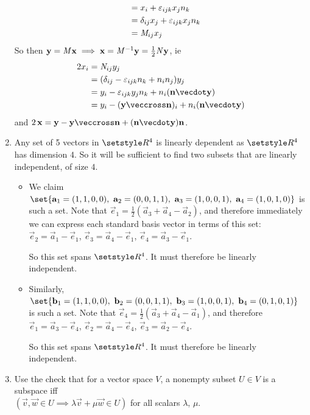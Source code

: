 \documentclass[fleqn,a4paper,11pt]{article}
\begin{document}
\begin{enumerate}[label=\textbf{\arabic*.}]
\begin{alignat*}
    &&           &= x_i + \epsilon_{ijk} x_j n_k \\
    &&           &= \delta_{ij} x_j + \epsilon_{ijk} x_j n_k \\
    &&           &= \mat M_{ij} x_j
   \end{alignat*}
   So then \(\mathrm{\mathbf{y}} = \mathit{M} \mathrm{\mathbf{x}} \implies
    \mathrm{\mathbf{x}} = \mathit{M}^{-1} \mathrm{\mathbf{y}} = \frac 12 \mathit{N} \mathrm{\mathbf{y}}\), ie
   \begin{align*}
    2 x_i &= \mat N_{ij} y_j \\
          &= (\delta_{ij} - \epsilon_{ijk} n_k + n_i n_j) y_j \\
          &= y_i - \epsilon_{ijk} y_j n_k + n_i(\vec n \vecdot \vec y) \\
          &= y_i - (\vec y \veccross \vec n)_i + n_i(\vec n \vecdot \vec y)
   \end{align*}
   and
   \(2\,\vec x
     = \vec y - \vec y \veccross \vec n + (\vec n \vecdot \vec y) \vec n\).
   \item
    Any set of 5 vectors in \(\Reals^4\) is linearly dependent as
    \(\Reals^4\) has dimension \(4\). So it will be sufficient to find two
    subsets that are linearly independent, of size \(4\).
    \begin{itemize}
     \item
      We claim
      \(\set{\vec a_1 = (1, 1, 0, 0),\ \vec a_2 = (0, 0, 1, 1),
           \ \vec a_3 = (1, 0, 0, 1),\ \vec a_4 = (1, 0, 1, 0)}\)
      is such a set. Note that
      \(\vec e_1 = \frac 12 (\vec a_3 + \vec a_4 - \vec a_2)\), and therefore
      immediately we can express each standard basis vector in terms of this
      set:
      \(\vec e_2 = \vec a_1 - \vec e_1\),
      \(\vec e_3 = \vec a_4 - \vec e_1\),
      \(\vec e_4 = \vec a_3 - \vec e_1\).

      So this set spans \(\Reals^4\). It must therefore be linearly independent.
     \item
      Similarly,
      \(\set{\vec b_1 = (1, 1, 0, 0),\ \vec b_2 = (0, 0, 1, 1),
           \ \vec b_3 = (1, 0, 0, 1),\ \vec b_4 = (0, 1, 0, 1)}\)
      is such a set. Note that
      \(\vec e_4 = \frac 12 (\vec a_3 + \vec a_4 - \vec a_1)\), and therefore
      \(\vec e_1 = \vec a_3 - \vec e_4\),
      \(\vec e_2 = \vec a_4 - \vec e_4\),
      \(\vec e_3 = \vec a_2 - \vec e_4\).

      So this set spans \(\Reals^4\). It must therefore be linearly independent.
    \end{itemize}
   \item
    Use the check that for a vector space \(V\), a nonempty subset \(U \in V\)
    is a subspace iff
    \\ \((\vec v, \vec w \in U \implies \lambda \vec v + \mu \vec w \in U)\) for
    all scalars \(\lambda\), \(\mu\).


\end{enumerate}
\end{document}
